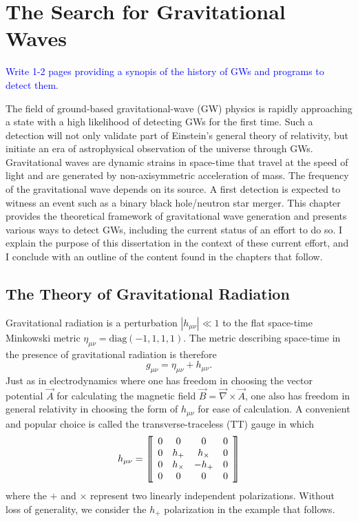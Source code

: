 \chapter{The Search for Gravitational Waves}

\textcolor{blue}{Write 1-2 pages providing a synopis of the history of
GWs and programs to detect them.}

The field of ground-based gravitational-wave (GW) physics is rapidly
approaching a state with a high likelihood of detecting GWs for the
first time. Such a detection will not only validate part of Einstein's
general theory of relativity, but initiate an era of astrophysical
observation of the universe through GWs. Gravitational waves are
dynamic strains in space-time that travel at the speed of light and
are generated by non-axisymmetric acceleration of mass. The frequency
of the gravitational wave depends on its source. A first detection is
expected to witness an event such as a binary black hole/neutron star
merger. This chapter provides the theoretical framework of
gravitational wave generation and presents various ways to detect GWs,
including the current status of an effort to do so. I explain the
purpose of this dissertation in the context of these current effort,
and I conclude with an outline of the content found in the chapters
that follow.


\section{The Theory of Gravitational Radiation}
Gravitational radiation is a perturbation $|h_{\mu \nu}|
\ll 1$ to the flat space-time Minkowski metric $\eta_{\mu \nu} =
\mbox{diag}(-1, 1, 1, 1)$. The metric describing space-time in the
presence of gravitational radiation is therefore
\begin{equation}
g_{\mu\nu} = \eta_{\mu\nu} + h_{\mu\nu}.
\end{equation}
Just as in electrodynamics where one has freedom in choosing the
vector potential $\vec{A}$ for calculating the magnetic field $\vec{B}
= \vec{\nabla} \times \vec{A}$, one also has freedom in general
relativity in choosing the form of $h_{\mu \nu}$ for ease of calculation. A
convenient and popular choice is called the transverse-traceless (TT)
gauge in which
\begin{equation}
h_{\mu \nu} = 
\left\llbracket \begin{array}{c c c c} 
0 & 0 & 0 & 0\\ 
0 & h_+ & h_\times & 0 \\
0 & h_\times & -h_+ & 0 \\
0 & 0 & 0 & 0
\end{array} \right\rrbracket
\end{equation}
where the $+$ and $\times$ represent two linearly independent
polarizations. Without loss of generality, we consider the $h_+$
polarization in the example that follows.


